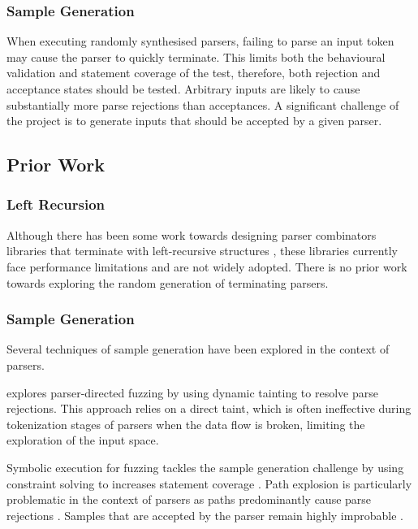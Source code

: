 \documentclass{article}
\let\oldciteauthor\citeauthor
\renewcommand{\citeauthor}[1]{\oldciteauthor{#1} \cite{#1}}
\begin{document}
\subsubsection{Sample Generation}
When executing randomly synthesised parsers, failing to parse an input token may cause the parser to quickly terminate. This limits both the behavioural validation and statement coverage of the test, therefore, both rejection and acceptance states should be tested. Arbitrary inputs are likely to cause substantially more parse rejections than acceptances. A significant challenge of the project is to generate inputs that should be accepted by a given parser.

\subsection{Prior Work}

\subsubsection{Left Recursion}
Although there has been some work towards designing parser combinators libraries that terminate with left-recursive structures \cite{left-recursive-detect}, these libraries currently face performance limitations and are not widely adopted. There is no prior work towards exploring the random generation of terminating parsers. 

\subsubsection{Sample Generation}

Several techniques of sample generation have been explored in the context of parsers. 

\citeauthor{parser-directed} explores parser-directed fuzzing by using dynamic tainting to resolve parse rejections. This approach relies on a direct taint, which is often ineffective during tokenization stages of parsers when the data flow is broken, limiting the exploration of the input space.

Symbolic execution for fuzzing tackles the sample generation challenge by using constraint solving to increases statement coverage \cite{klee}. Path explosion is particularly problematic in the context of parsers as paths predominantly cause parse rejections \cite{path-explosion}. Samples that are accepted by the parser remain highly improbable \cite{parser-directed}.
\end{document}
